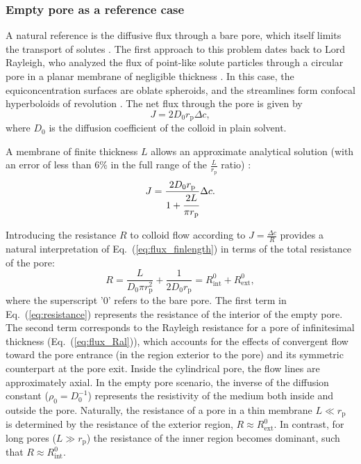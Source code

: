 \documentclass[12pt, a4paper]{article}
\begin{document}
\subsubsection{Empty pore as a reference case}

A natural reference is the diffusive flux through a bare pore, which itself limits the transport of solutes \cite{Deen1987, Sun2024}.
The first approach to this problem dates back to Lord Rayleigh, who analyzed the flux of point-like solute particles through a circular pore in a planar membrane of negligible thickness \cite{Strutt1878}.
In this case, the equiconcentration surfaces are oblate spheroids, and the streamlines form confocal hyperboloids of revolution \cite{Cooke1966}.
The net flux through the pore is given by
\begin{equation}
    J=2D_0r_{\text{p}}\Delta c,
    \label{eq:flux_Ral}
\end{equation}
where $D_0$ is the diffusion coefficient of the colloid in plain solvent.

A membrane of finite thickness $L$ allows an approximate analytical solution (with an error of less than 6\% in the full range of the $\frac{L}{r_{\text{p}}}$ ratio) \cite{Brunn1984}:
\begin{equation}
    J=\frac{2 D_0 r_{\text{p}}}{1+\cfrac{2L}{\pi r_{\text{p}}}}\Delta c.
    \label{eq:flux_finlength}
\end{equation}

Introducing the resistance $R$ to colloid flow according to $J = \frac{\Delta c}{R}$ provides a natural interpretation of Eq.~(\ref{eq:flux_finlength}) in terms of the total resistance of the pore:
\begin{equation}
    R = \frac{L}{D_0 \pi r_{\text{p}}^{2}} + \frac{1}{2 D_0 r_{\text{p}}} = R_{\text{int}}^{0} + R_{\text{ext}}^{0},
    \label{eq:resistance}
\end{equation}
where the superscript '0' refers to the bare pore.
The first term in Eq.~(\ref{eq:resistance}) represents the resistance of the interior of the empty pore.
The second term corresponds to the Rayleigh resistance for a pore of infinitesimal thickness (Eq.~(\ref{eq:flux_Ral})), which accounts for the effects of convergent flow toward the pore entrance (in the region exterior to the pore) and its symmetric counterpart at the pore exit.
Inside the cylindrical pore, the flow lines are approximately axial.
In the empty pore scenario, the inverse of the diffusion constant ($\rho_0=D_0^{-1}$) represents the resistivity of the medium both inside and outside the pore.
Naturally,  the resistance of a pore in a thin membrane $L \ll r_{\text{p}}$ is determined by the resistance of the exterior region, $R \approx R_{\text{ext}}^{0}$.
In contrast, for long pores ($L \gg r_{\text{p}}$) the resistance of the inner region becomes dominant, such that $R \approx R_{\text{int}}^{0}$.
\end{document}
